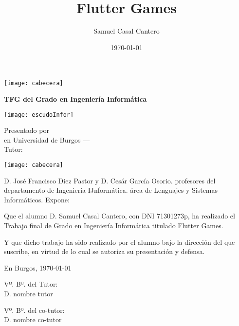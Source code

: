 \documentclass[a4paper,12pt,twoside]{memoir}
\title{Flutter Games}
\author{Samuel Casal Cantero}
\date{\today}
\makeatletter
\def\maketitle{
  \null
  \thispagestyle{empty}
\noindent\texttt{[image: cabecera]}\vspace{1cm}%
  \vfill
  \colorbox{cpardoBox}{%
    \begin{minipage}{.8\textwidth}
      \vspace{.5cm}\Large
      \begin{center}
      \textbf{TFG del Grado en Ingeniería Informática}\vspace{.6cm}\\
      \textbf{\LARGE\@title{}}
      \end{center}
      \vspace{.2cm}
    \end{minipage}

  }%
  \hfill\begin{minipage}{.20\textwidth}
    \texttt{[image: escudoInfor]}
  \end{minipage}
  \vfill
  \begin{center}%
  {%
    \noindent\LARGE
    Presentado por \@author{}\\ 
    en Universidad de Burgos --- \@date{}\\
    Tutor: \@tutor{}\\
  }%
  \end{center}%
  \null
  \cleardoublepage
  }
\newcommand{\nombre}{Samuel Casal Cantero} %
\newcommand{\tfg}{Flutter Games}
\makeatother
\begin{document}
\maketitle


\newpage\null\thispagestyle{empty}\newpage


\thispagestyle{empty}


\noindent\texttt{[image: cabecera]}\vspace{1cm}

\noindent D. José Francisco Diez Pastor y D. Cesár García Osorio. profesores del departamento de Ingeniería IJnformática. área de Lenguajes y Sistemas Informáticos.
\noindent Expone:

\noindent Que el alumno D. \nombre, con DNI 71301273p, ha realizado el Trabajo final de Grado en Ingeniería Informática titulado \tfg. 

\noindent Y que dicho trabajo ha sido realizado por el alumno bajo la dirección del que suscribe, en virtud de lo cual se autoriza su presentación y defensa.

\begin{center} %
En Burgos, {\large \today}
\end{center}

\vfill\vfill\vfill

\begin{minipage}{0.45\textwidth}
\begin{flushleft} %
Vº. Bº. del Tutor:\\[2cm]
D. nombre tutor
\end{flushleft}
\end{minipage}
\hfill
\begin{minipage}{0.45\textwidth}
\begin{flushleft} %
Vº. Bº. del co-tutor:\\[2cm]
D. nombre co-tutor
\end{flushleft}
\end{minipage}
\hfill

\vfill



\newpage\null\thispagestyle{empty}\newpage




\frontmatter
\end{document}
